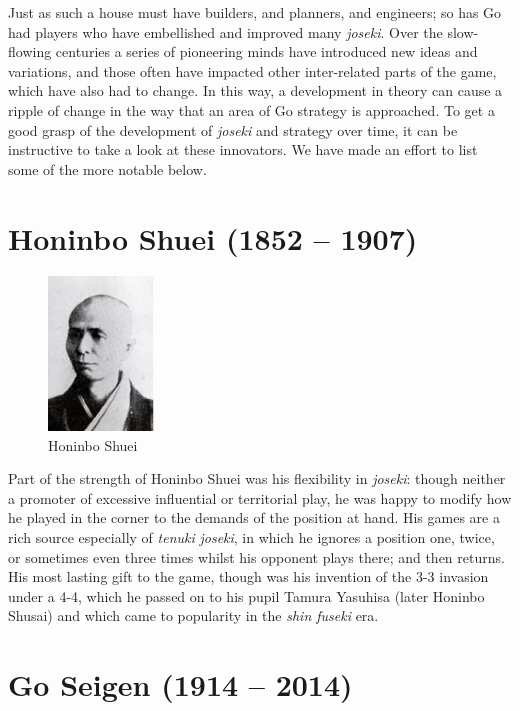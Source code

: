 \documentclass[a5paper,12pt,twoside]{book} %
\newcounter{joseki}                 %
\begin{document}
Just as such a house must have builders, and planners, and engineers; so has Go had players who have embellished and improved many \textit{joseki}. Over the slow-flowing centuries a series of pioneering minds have introduced new ideas and variations, and those often have impacted other inter-related parts of the game, which have also had to change. In this way, a development in theory can cause a ripple of change in the way that  an area of Go strategy is approached. To get a good grasp of the development of \textit{joseki} and strategy over time, it can be instructive to take a look at these innovators. We have made an effort to list some of the more notable below.\\


\section*{Honinbo Shuei (1852 – 1907)}

\begin{figure}
\centering
\includegraphics[width=0.25\textwidth]{Shuei.eps}
\caption*{\label{fig:Shuei}Honinbo Shuei}
\end{figure}

Part of the strength of Honinbo Shuei was his flexibility in \textit{joseki}: though neither a promoter of excessive influential or territorial play, he was happy to modify how he played in the corner to the demands of the position at hand. His games are a rich source especially of \textit{tenuki} \textit{joseki}, in which he ignores a position one, twice, or sometimes even three times whilst his opponent plays there; and then returns. His most lasting gift to the game, though was his invention of the 3-3 invasion under a 4-4, which he passed on to his pupil Tamura Yasuhisa (later Honinbo Shusai) and which came to popularity in the \textit{shin fuseki} era. \\

\section*{Go Seigen (1914 – 2014)}
\end{document}
